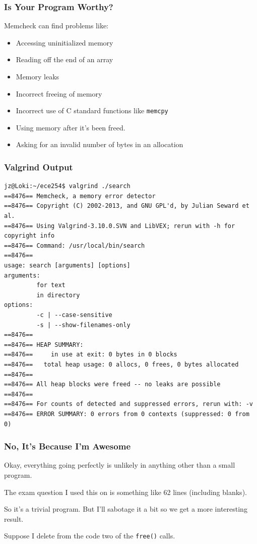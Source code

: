 \begin{frame}
\frametitle{Is Your Program Worthy?}

Memcheck can find problems like:
\begin{itemize}
	\item Accessing uninitialized memory
	\item Reading off the end of an array
	\item Memory leaks
	\item Incorrect freeing of memory
	\item Incorrect use of C standard functions like \texttt{memcpy}
	\item Using memory after it's been freed.
	\item Asking for an invalid number of bytes in an allocation
\end{itemize}

\end{frame}

\begin{frame}[fragile]
\frametitle{Valgrind Output}
{\scriptsize
\begin{verbatim}
jz@Loki:~/ece254$ valgrind ./search
==8476== Memcheck, a memory error detector
==8476== Copyright (C) 2002-2013, and GNU GPL'd, by Julian Seward et al.
==8476== Using Valgrind-3.10.0.SVN and LibVEX; rerun with -h for copyright info
==8476== Command: /usr/local/bin/search
==8476== 
usage: search [arguments] [options]
arguments:
         for text
         in directory
options:
         -c | --case-sensitive
         -s | --show-filenames-only
==8476== 
==8476== HEAP SUMMARY:
==8476==     in use at exit: 0 bytes in 0 blocks
==8476==   total heap usage: 0 allocs, 0 frees, 0 bytes allocated
==8476== 
==8476== All heap blocks were freed -- no leaks are possible
==8476== 
==8476== For counts of detected and suppressed errors, rerun with: -v
==8476== ERROR SUMMARY: 0 errors from 0 contexts (suppressed: 0 from 0)
\end{verbatim}
}

\end{frame}

\begin{frame}
\frametitle{No, It's Because I'm Awesome}

Okay, everything going perfectly is unlikely in anything other than a small program. 

The exam question I used this on is something like 62 lines (including blanks). 

So it's a trivial program. But I'll sabotage it a bit so we get a more interesting result. 

Suppose I delete from the code two of the \texttt{free()} calls.

\end{frame}

